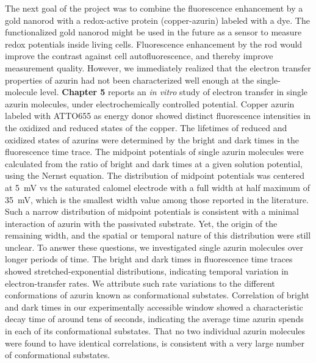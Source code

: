 The next goal of the project was to combine the fluorescence enhancement by a gold nanorod with a redox-active protein (copper-azurin) labeled with a dye.
The functionalized gold nanorod might be used in the future as a sensor to measure redox potentials inside living cells.
Fluorescence enhancement by the rod would improve the contrast against cell autofluorescence, and thereby improve measurement quality.
However, we immediately realized that the electron transfer properties of azurin had not been characterized well enough at the single-molecule level.
\textbf{Chapter 5} reports an \textit{in vitro} study of electron transfer in single azurin molecules, under electrochemically controlled potential.
Copper azurin labeled with ATTO655 as energy donor showed distinct fluorescence intensities in the oxidized and reduced states of the copper.
The lifetimes of reduced and oxidized states of azurins were determined by the bright and dark times in the fluorescence time trace.
The midpoint potentials of single azurin molecules were calculated from the ratio of bright and dark times at a given solution potential, using the Nernst equation.
The distribution of midpoint potentials was centered at \SI{5}{\mV} vs the saturated calomel electrode with a full width at half maximum of \SI{35}{\mV}, which is the smallest width value among those reported in the literature.
Such a narrow distribution of midpoint potentials is consistent with a minimal interaction of azurin with the passivated substrate.
Yet, the origin of the remaining width, and the spatial or temporal nature of this distribution were still unclear.
To answer these questions, we investigated single azurin molecules over longer periods of time.
The bright and dark times in fluorescence time traces showed stretched-exponential distributions, indicating temporal variation in electron-transfer rates.
We attribute such rate variations to the different conformations of azurin known as conformational substates.
Correlation of bright and dark times in our experimentally accessible window showed a characteristic decay time of around tens of seconds, indicating the average time azurin spends in each of its conformational substates.
That no two individual azurin molecules were found to have identical correlations, is consistent with a very large number of conformational substates.